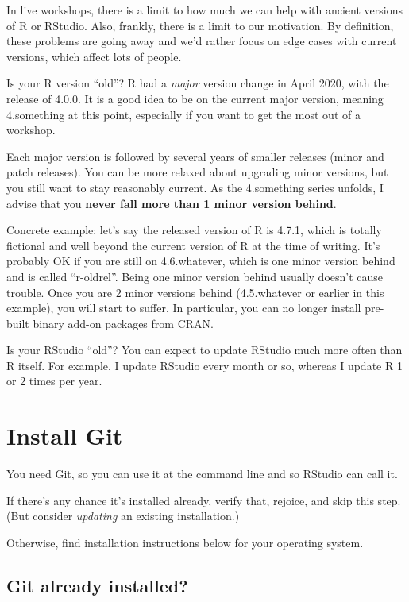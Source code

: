 \documentclass[
]{book}
\begin{document}
In live workshops, there is a limit to how much we can help with ancient versions of R or RStudio. Also, frankly, there is a limit to our motivation. By definition, these problems are going away and we'd rather focus on edge cases with current versions, which affect lots of people.

Is your R version ``old''? R had a \emph{major} version change in April 2020, with the release of 4.0.0. It is a good idea to be on the current major version, meaning 4.something at this point, especially if you want to get the most out of a workshop.

Each major version is followed by several years of smaller releases (minor and patch releases). You can be more relaxed about upgrading minor versions, but you still want to stay reasonably current. As the 4.something series unfolds, I advise that you \textbf{never fall more than 1 minor version behind}.

Concrete example: let's say the released version of R is 4.7.1, which is totally fictional and well beyond the current version of R at the time of writing.
It's probably OK if you are still on 4.6.whatever, which is one minor version behind and is called ``r-oldrel''.
Being one minor version behind usually doesn't cause trouble.
Once you are 2 minor versions behind (4.5.whatever or earlier in this example), you will start to suffer.
In particular, you can no longer install pre-built binary add-on packages from CRAN.

Is your RStudio ``old''?
You can expect to update RStudio much more often than R itself.
For example, I update RStudio every month or so, whereas I update R 1 or 2 times per year.

\chapter{Install Git}\label{install-git}

You need Git, so you can use it at the command line and so RStudio can call it.

If there's any chance it's installed already, verify that, rejoice, and skip this step. (But consider \emph{updating} an existing installation.)

Otherwise, find installation instructions below for your operating system.

\section{Git already installed?}\label{git-already-installed}
\end{document}
